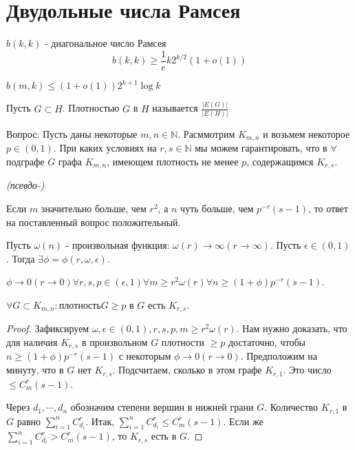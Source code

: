 \section{Двудольные числа Рамсея}
$b(k, k)$ - диагональное число Рамсея
$$b(k,k) \ge \frac{1}{e}k 2 ^ {k/2} (1 + o(1)) $$

\begin{theorem}
    $b(m, k) \le (1 +o(1))2^{k+1}\log{k}$
\end{theorem}

\begin{definition}
    Пусть $G \subset H$. Плотностью $G$ в $H$ называется $\frac{|E(G)|}{|E(H)|}$
\end{definition}

Вопрос: Пусть даны некоторые $m, n \in \mathbb{N}$. Расммотрим $K_{m,n}$ и возьмем некоторое $p\in(0, 1)$.
При каких условиях на $r, s \in \mathbb{N}$ мы можем гарантировать, что в $\forall$ подграфе $G$ графа $K_{m,n}$,
имеющем плотность не менее $p$, содержащимся $K_{r,s}$.

\begin{lemma}
    \emph{(псевдо-)}

    Если $m$ значительно больше, чем $r^2$, а $n$ чуть больше, чем $p^{-r}(s-1)$, то ответ на поставленный вопрос положительный.
\end{lemma}

\begin{lemma}
    Пусть $\omega(n)$ - произвольная функция: $\omega(r) \rightarrow \infty (r \rightarrow \infty)$.
    Пусть $\epsilon\in(0,1)$. Тогда $\exists \phi = \phi(r, \omega, \epsilon)$.
    
    $\phi \rightarrow 0 (r \rightarrow 0) \forall r, s, p \in (\epsilon, 1) \forall m \ge r^2 \omega(r) 
    \forall n \ge (1 + \phi)p^{-r}(s-1)$.

    $\forall G \subset K_{m, n} : плотность G \ge p$ в $G$ есть $K_{r,s}$.

    \begin{proof}
        Зафиксируем $\omega, \epsilon \in (0, 1), r, s, p, m \ge r^2 \omega(r)$.
        Нам нужно доказать, что для наличия $K_{r,s}$ в произвольном $G$ плотности $\ge p$ достаточно, чтобы 
        $n \ge (1 + \phi)p^{-r}(s-1)$ с некоторым $\phi \rightarrow 0 (r \rightarrow 0)$.
        Предположим на минуту, что в $G$ нет $K_{r,s}$. Подсчитаем, сколько в этом графе $K_{r,1}$.
        Это число $\le C_m^r(s - 1)$.

        Через $d_1, \cdots, d_n$ обозначим степени вершин в нижней грани $G$.
        Количество $K_{r,1}$ в $G$ равно $\sum_{i=1}^{n} C_{d_i}^r$. Итак, $\sum_{i=1}^{n} C_{d_i}^r \le C_m^r(s-1)$.
        Если же $\sum_{i=1}^{n} C_{d_i}^r > C_m^r(s-1)$, то $K_{r,s}$ есть в $G$.
    \end{proof}
\end{lemma}

